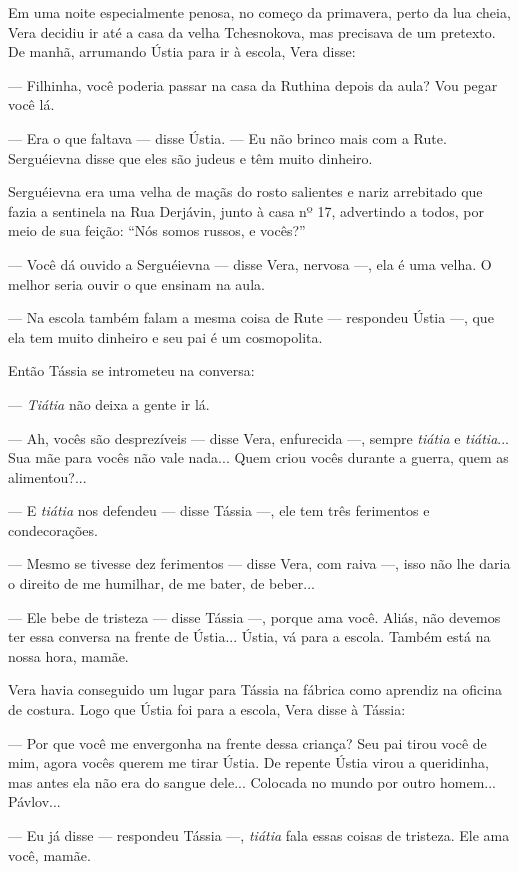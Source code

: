 Em uma noite especialmente penosa, no começo da primavera, perto da lua
cheia, Vera decidiu ir até a casa da velha Tchesnokova, mas precisava de
um pretexto. De manhã, arrumando Ústia para ir à escola, Vera disse:

--- Filhinha, você poderia passar na casa da Ruthina depois da aula? Vou
pegar você lá.

--- Era o que faltava --- disse Ústia. --- Eu não brinco mais com a
Rute. Serguéievna disse que eles são judeus e têm muito dinheiro.

Serguéievna era uma velha de maçãs do rosto salientes e nariz arrebitado
que fazia a sentinela na Rua Derjávin, junto à casa nº 17, advertindo a
todos, por meio de sua feição: ``Nós somos russos, e vocês?''

--- Você dá ouvido a Serguéievna --- disse Vera, nervosa ---, ela é uma
velha. O melhor seria ouvir o que ensinam na aula.

--- Na escola também falam a mesma coisa de Rute --- respondeu Ústia
---, que ela tem muito dinheiro e seu pai é um cosmopolita.

Então Tássia se intrometeu na conversa:

--- \emph{Tiátia} não deixa a gente ir lá.

--- Ah, vocês são desprezíveis --- disse Vera, enfurecida ---, sempre
\emph{tiátia} e \emph{tiátia}... Sua mãe para vocês não vale nada...
Quem criou vocês durante a guerra, quem as alimentou?...

--- E \emph{tiátia} nos defendeu --- disse Tássia ---, ele tem três
ferimentos e condecorações.

--- Mesmo se tivesse dez ferimentos --- disse Vera, com raiva ---, isso
não lhe daria o direito de me humilhar, de me bater, de beber...

--- Ele bebe de tristeza --- disse Tássia ---, porque ama você. Aliás,
não devemos ter essa conversa na frente de Ústia... Ústia, vá para a
escola. Também está na nossa hora, mamãe.

Vera havia conseguido um lugar para Tássia na fábrica como aprendiz na
oficina de costura. Logo que Ústia foi para a escola, Vera disse à
Tássia:

--- Por que você me envergonha na frente dessa criança? Seu pai tirou
você de mim, agora vocês querem me tirar Ústia. De repente Ústia virou a
queridinha, mas antes ela não era do sangue dele... Colocada no mundo
por outro homem... Pávlov...

--- Eu já disse --- respondeu Tássia ---, \emph{tiátia} fala essas
coisas de tristeza. Ele ama você, mamãe.

